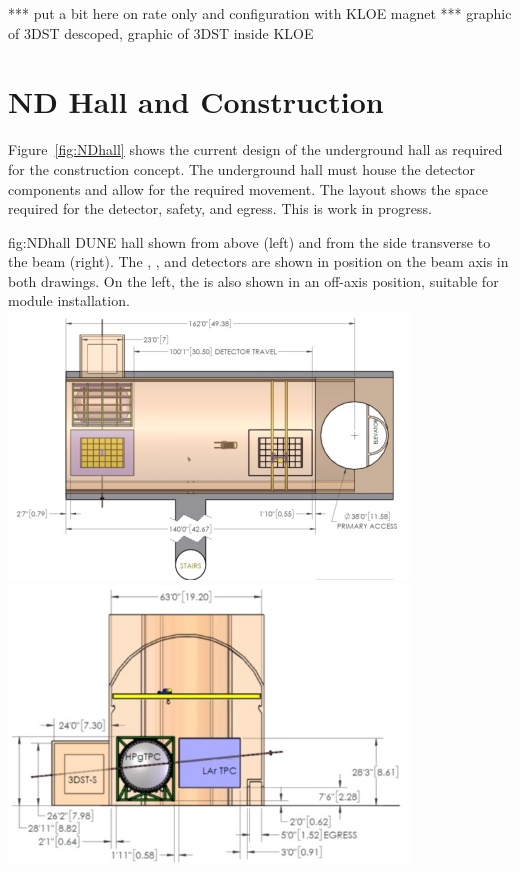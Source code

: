 *** put a bit here on rate only and configuration with KLOE magnet ***
graphic of 3DST descoped, graphic of 3DST inside KLOE

\section{ND Hall and Construction}
\label{sec:appx-nd:exsum-nd-hall}
%

Figure~\ref{fig:NDhall} shows the current design of the underground hall as required for the   construction concept. The underground hall must house the detector components and allow for the required movement. The layout shows the space required for the detector, safety, and egress.  This is work in progress. 

\begin{dunefigure}{fig:NDhall}
{DUNE   hall shown from above (left) and from the side transverse to the beam (right). The , , and  detectors are shown in position on the beam axis in both drawings.  On the left, the  is also shown in an off-axis position, suitable for module installation. }
\includegraphics[width=0.8\textwidth]{graphics/NDhall1.jpg}
\includegraphics[width=0.8\textwidth]{graphics/NDhall2.jpg}
\end{dunefigure}

